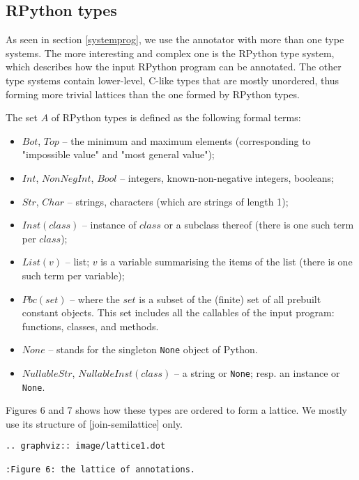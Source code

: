 \documentclass{acm_proc_article-sp}
\begin{document}
\subsection{RPython types}

As seen in section \ref{systemprog}, we use the annotator with more than one type
systems.  The more interesting and complex one is the RPython type
system, which describes how the input RPython program can be annotated.
The other type systems contain lower-level, C-like types that are mostly
unordered, thus forming more trivial lattices than the one formed by
RPython types.

The set $A$ of RPython types is defined as the following formal terms:
%
\begin{itemize}
\item $Bot$, $Top$ -- the minimum and maximum elements (corresponding
      to "impossible value" and "most general value");

\item $Int$, $NonNegInt$, $Bool$ -- integers, known-non-negative
      integers, booleans;

\item $Str$, $Char$ -- strings, characters (which are strings of
      length 1);

\item $Inst(class)$ -- instance of $class$ or a subclass thereof
      (there is one such term per $class$);

\item $List(v)$ -- list; $v$ is a variable summarising the items of
      the list (there is one such term per variable);

\item $Pbc(set)$ -- where the $set$ is a subset of the (finite) set of
      all prebuilt constant objects.  This set includes all the
      callables of the input program: functions, classes, and methods.

\item $None$ -- stands for the singleton \texttt{None} object of
      Python.

\item $NullableStr$, $NullableInst(class)$ -- a string or
      \texttt{None}; resp. an instance or \texttt{None}.
\end{itemize}
%
Figures 6 and 7 shows how these types are ordered to form a lattice.  We
mostly use its structure of [join-semilattice] only.

\begin{verbatim}
.. graphviz:: image/lattice1.dot

:Figure 6: the lattice of annotations.
\end{verbatim}
\end{document}
